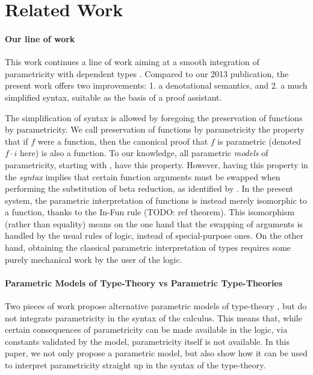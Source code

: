 \documentclass[english]{PaperTools/latex/lipics}
\newcommand\param[1]{\!\cdot\!#1}
\begin{document}
\section{Related Work}

\paragraph{Our line of work}
This work continues a line of work aiming at a smooth integration of
parametricity with dependent types
\citep{bernardy_proofs_2012,bernardy_computational_2012,bernardy_type-theory_2013}. Compared to our 2013 publication, the present work offers two improvements:
1. a denotational semantics, and
2. a much simplified syntax, suitable as the basis of a proof assistant.

The simplification of syntax is allowed by foregoing the preservation
of functions by parametricity. We call preservation of functions by
parametricity the property that if $f$ were a function, then the
canonical proof that $f$ is parametric (denoted $f \param i$ here) is
also a function. To our knowledge, all parametric \emph{models} of parametricity,
starting with \citet{reynolds_types_1983}, have this property.
However, having this property in the \emph{syntax} implies that
certain function arguments must be swapped when performing the
substitution of beta reduction, as identified by
\citet{bernardy_computational_2012}.  In the present system, the
parametric interpretation of functions is instead merely isomorphic to
a function, thanks to the {\sc In-Fun} rule (TODO: ref theorem). This
isomorphism (rather than equality) means on the one hand that the
swapping of arguments is handled by the usual rules of logic, instead
of special-purpose ones. On the other hand, obtaining the classical
parametric interpretation of types requires some purely mechanical
work by the user of the logic.

\paragraph{Parametric Models of Type-Theory vs Parametric Type-Theories}

Two pieces of work propose alternative parametric models of
type-theory
\citep{atkey_relationally_2014,krishnaswami_internalizing_2013}, but
do not integrate parametricity in the syntax of the calculus. This
means that, while certain consequences of parametricity can be made
available in the logic, via constants validated by the model,
parametricity itself is not available. In this paper, we not only
propose a parametric model, but also show how it can be used to
interpret parametricity straight up in the syntax of the type-theory.
\end{document}
